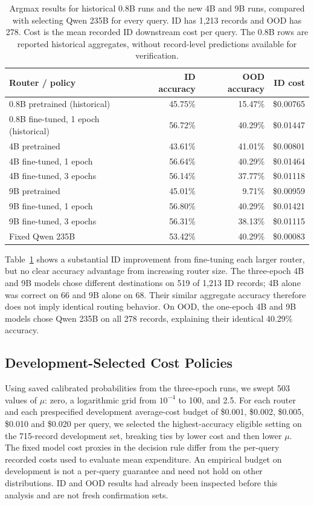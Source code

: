 \documentclass[11pt,a4paper]{article}
\begin{document}
\begin{table}[t]
\centering
\small
\caption{Argmax results for historical 0.8B runs and the new 4B and 9B runs, compared with selecting Qwen 235B for every query. ID has 1,213 records and OOD has 278. Cost is the mean recorded ID downstream cost per query. The 0.8B rows are reported historical aggregates, without record-level predictions available for verification.}
\label{tab:size_results}
\begin{tabular}{lrrr}
\toprule
\textbf{Router / policy} & \textbf{ID accuracy} & \textbf{OOD accuracy} & \textbf{ID cost} \\
\midrule
0.8B pretrained (historical) & 45.75\% & 15.47\% & \$0.00765 \\
0.8B fine-tuned, 1 epoch (historical) & 56.72\% & 40.29\% & \$0.01447 \\
4B pretrained & 43.61\% & 41.01\% & \$0.00801 \\
4B fine-tuned, 1 epoch & 56.64\% & 40.29\% & \$0.01464 \\
4B fine-tuned, 3 epochs & 56.14\% & 37.77\% & \$0.01118 \\
9B pretrained & 45.01\% & 9.71\% & \$0.00959 \\
9B fine-tuned, 1 epoch & 56.80\% & 40.29\% & \$0.01421 \\
9B fine-tuned, 3 epochs & 56.31\% & 38.13\% & \$0.01115 \\
Fixed Qwen 235B & 53.42\% & 40.29\% & \$0.00083 \\
\bottomrule
\end{tabular}
\end{table}

Table~\ref{tab:size_results} shows a substantial ID improvement from fine-tuning each larger router, but no clear accuracy advantage from increasing router size. The three-epoch 4B and 9B models chose different destinations on 519 of 1,213 ID records; 4B alone was correct on 66 and 9B alone on 68. Their similar aggregate accuracy therefore does not imply identical routing behavior. On OOD, the one-epoch 4B and 9B models chose Qwen 235B on all 278 records, explaining their identical 40.29\% accuracy.

\subsection{Development-Selected Cost Policies}
\label{subsec:cost_curves}

Using saved calibrated probabilities from the three-epoch runs, we swept 503 values of $\mu$: zero, a logarithmic grid from $10^{-4}$ to 100, and 2.5. For each router and each prespecified development average-cost budget of \$0.001, \$0.002, \$0.005, \$0.010 and \$0.020 per query, we selected the highest-accuracy eligible setting on the 715-record development set, breaking ties by lower cost and then lower $\mu$. The fixed model cost proxies in the decision rule differ from the per-query recorded costs used to evaluate mean expenditure. An empirical budget on development is not a per-query guarantee and need not hold on other distributions. ID and OOD results had already been inspected before this analysis and are not fresh confirmation sets.
\end{document}
